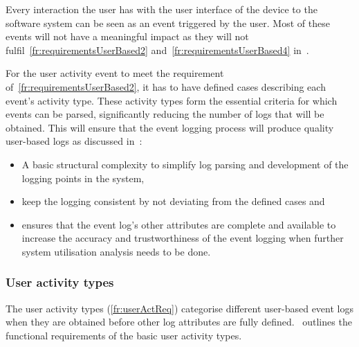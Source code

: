 Every interaction the user has with the user interface of the device to the software system can be seen as an event triggered by the user. Most of these events will not have a meaningful impact as they will not fulfil~\ref{fr:requirementsUserBased2} and~\ref{fr:requirementsUserBased4} in~.

\clearpage

For the user activity event to meet the requirement of~\ref{fr:requirementsUserBased2}, it has to have defined cases describing each event's activity type. These activity types form the essential criteria for which events can be parsed, significantly reducing the number of logs that will be obtained. This will ensure that the event logging process will produce quality user-based logs as discussed in~:

\begin{itemize}
	\item A basic structural complexity to simplify log parsing and development of the logging points in the system,
	\item keep the logging consistent by not deviating from the defined cases and
	\item ensures that the event log's other attributes are complete and available to increase the accuracy and trustworthiness of the event logging when further system utilisation analysis needs to be done. 
\end{itemize}

\subsubsection{User activity types}\label{sec:ch2_userActivityTypes}
The user activity types (\ref{fr:userActReq}) categorise different user-based event logs when they are obtained before other log attributes are fully defined.~ outlines the functional requirements of the basic user activity types.

